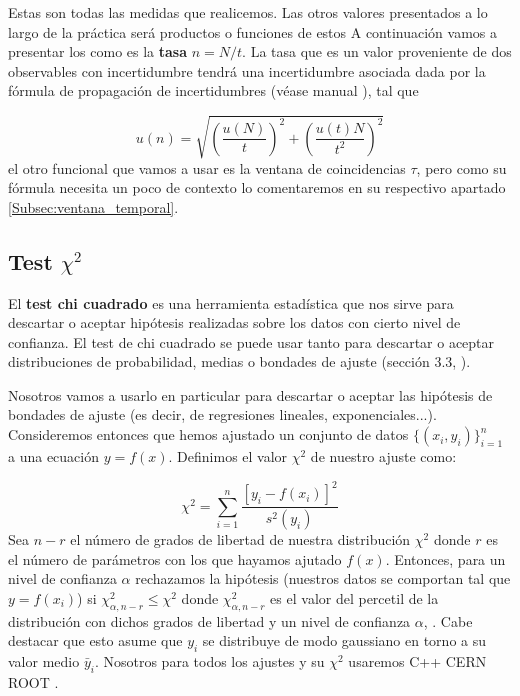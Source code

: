 \documentclass[11pt]{article}
\newcommand{\parentesis}[1]{\left( #1  \right)}
\newcommand{\ccorchetes}[1]{\left[ #1  \right]}
\begin{document}
Estas son todas las medidas que realicemos. Las otros valores presentados a lo largo de la práctica será productos o funciones de estos A continuación vamos a presentar los como es la \textbf{tasa} $n=N/t$. La tasa que es un valor proveniente de dos observables con incertidumbre tendrá una incertidumbre asociada dada por la fórmula de propagación de incertidumbres (véase manual \cite{Estadistica}), tal que

\begin{equation}
	u(n) = \sqrt{\parentesis{\frac{u(N)}{t}}^2 + \parentesis{\frac{u(t)N}{t^2}}^2}
\end{equation}
el otro funcional que vamos a usar es la ventana de coincidencias $\tau$, pero como su fórmula necesita un poco de contexto lo comentaremos en su respectivo apartado \ref{Subsec:ventana_temporal}.

\subsection{Test $\chi^2$} \label{Subsec:chi_cuadrado}

El \textbf{test chi cuadrado} es una herramienta estadística que nos sirve para descartar o aceptar hipótesis realizadas sobre los datos con cierto nivel de confianza. El test de chi cuadrado se puede usar tanto para descartar o aceptar distribuciones de probabilidad, medias o bondades de ajuste (sección 3.3, \cite{Estadistica}).

Nosotros vamos a usarlo en particular para descartar o aceptar las hipótesis de bondades de ajuste (es decir, de regresiones lineales, exponenciales...). Consideremos entonces que hemos ajustado un conjunto de datos $\{  (x_i,y_i)\}_{i=1}^n$ a una ecuación $y=f(x)$. Definimos el valor $\chi^2$ de nuestro ajuste como:

\begin{equation}
	\chi^2 = \sum_{i=1}^n \frac{\ccorchetes{y_i-f(x_i)}^2}{s^2(y_i)}
\end{equation}
Sea $n-r$ el número de grados de libertad de nuestra distribución $\chi^2$ donde $r$ es el número de parámetros con los que hayamos ajutado $f(x)$. Entonces, para un nivel de confianza $\alpha$ rechazamos la hipótesis (nuestros datos se comportan tal que $y=f(x_i)$) si $\chi^2_{\alpha,n-r} \leq \chi^2$ donde $\chi^2_{\alpha,n-r}$ es el valor del percetil de la distribución con dichos grados de libertad y un nivel de confianza $\alpha$, \cite{Estadistica}. Cabe destacar que esto asume que $y_i$ se distribuye de modo gaussiano en torno a su valor medio $\bar{y}_i$. Nosotros para todos los ajustes y su $\chi^2$ usaremos C++ CERN ROOT \cite{Root}.
\end{document}
